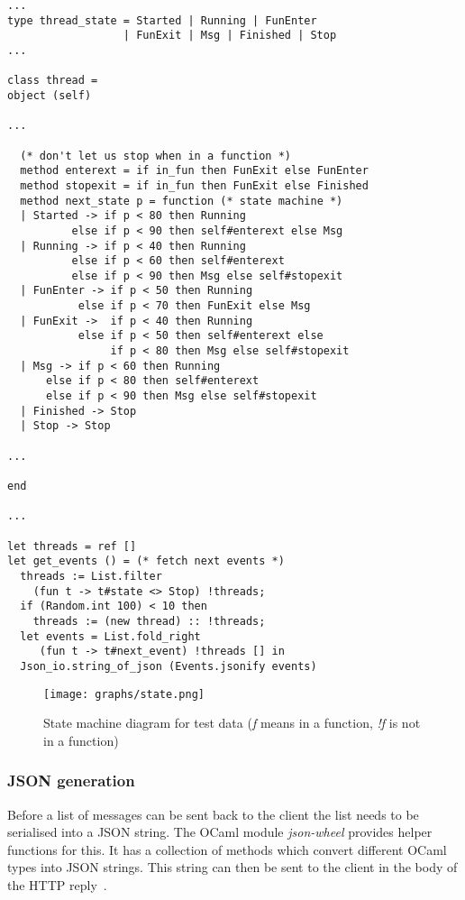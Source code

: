 \begin{lstlisting}[caption={state machine and \texttt{get\_events} function from thread\_state.ml}]
...
type thread_state = Started | Running | FunEnter
                  | FunExit | Msg | Finished | Stop
...

class thread =
object (self)

...

  (* don't let us stop when in a function *)
  method enterext = if in_fun then FunExit else FunEnter
  method stopexit = if in_fun then FunExit else Finished 
  method next_state p = function (* state machine *)
  | Started -> if p < 80 then Running
          else if p < 90 then self#enterext else Msg
  | Running -> if p < 40 then Running
          else if p < 60 then self#enterext
          else if p < 90 then Msg else self#stopexit
  | FunEnter -> if p < 50 then Running
           else if p < 70 then FunExit else Msg
  | FunExit ->  if p < 40 then Running
           else if p < 50 then self#enterext else
                if p < 80 then Msg else self#stopexit
  | Msg -> if p < 60 then Running
      else if p < 80 then self#enterext
      else if p < 90 then Msg else self#stopexit
  | Finished -> Stop
  | Stop -> Stop

...

end

...

let threads = ref []
let get_events () = (* fetch next events *)
  threads := List.filter
    (fun t -> t#state <> Stop) !threads;
  if (Random.int 100) < 10 then
    threads := (new thread) :: !threads;
  let events = List.fold_right
     (fun t -> t#next_event) !threads [] in
  Json_io.string_of_json (Events.jsonify events)
\end{lstlisting}

\begin{figure}
  \centering
  \texttt{[image: graphs/state.png]}
  \caption{State machine diagram for test data (\emph{f} means in a function, \emph{!f} is not in a function)}
  \label{fig:state}
\end{figure}

\subsubsection{JSON generation}
Before a list of messages can be sent back to the client the list needs to be serialised into a JSON string. The OCaml module \emph{json-wheel} provides helper functions for this. It has a collection of methods which convert different OCaml types into JSON strings. This string can then be sent to the client in the body of the HTTP reply~\cite{bib:json_rfc}.

